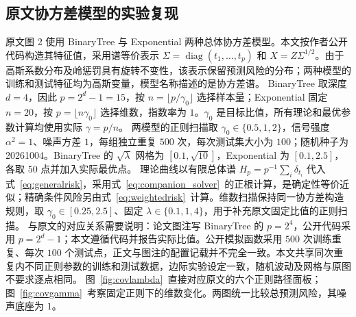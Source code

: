 \documentclass[UTF8,fontset=fandol,a4paper,zihao=-4]{ctexart}
\begin{document}
\subsection{原文协方差模型的实验复现}\label{sec:covariance_experiments}
原文图 2 使用 BinaryTree 与 Exponential 两种总体协方差模型\cite{dw,authorcode}。本文按作者公开代码构造其特征值，采用谱等价表示 $\Sigma=\operatorname{diag}(t_1,\ldots,t_p)$ 和 $X=Z\Sigma^{1/2}$。由于高斯系数分布及岭惩罚具有旋转不变性，该表示保留预测风险的分布；两种模型的训练和测试特征均为高斯变量，模型名称描述的是协方差谱。
BinaryTree 取深度 $d=4$，因此 $p=2^d-1=15$，按 $n=\lfloor p/\gamma_0\rfloor$ 选择样本量；Exponential 固定 $n=20$，按 $p=\lfloor n\gamma_0\rfloor$ 选择维数，指数率为 $1$。$\gamma_0$ 是目标比值，所有理论和最优参数计算均使用实际 $\gamma=p/n$。
两模型的正则扫描取 $\gamma_0\in\{0.5,1,2\}$，信号强度 $\alpha^2=1$、噪声方差 $1$，每组独立重复 $500$ 次，每次测试集大小为 $100$；随机种子为 20261004。BinaryTree 的 $\sqrt{\lambda}$ 网格为 $[0.1,\sqrt{10}]$，Exponential 为 $[0.1,2.5]$，各取 $50$ 点并加入实际最优点。
理论曲线以有限总体谱 $H_p=p^{-1}\sum_i\delta_{t_i}$ 代入式~\eqref{eq:generalrisk}，采用式~\eqref{eq:companion_solver}~的正根计算，是确定性等价近似；精确条件风险另由式~\eqref{eq:weightedrisk}~计算。维数扫描保持同一协方差构造规则，取 $\gamma_0\in[0.25,2.5]$、固定 $\lambda\in\{0.1,1,4\}$，用于补充原文固定比值的正则扫描。
与原文的对应关系需要说明：论文图注写 BinaryTree 的 $p=2^4$，公开代码采用 $p=2^d-1$；本文遵循代码并报告实际比值。公开模拟函数采用 $500$ 次训练重复、每次 $100$ 个测试点，正文与图注的配置记载并不完全一致。本文共享同次重复内不同正则参数的训练和测试数据，边际实验设定一致，随机波动及网格与原图不要求逐点相同。
图~\ref{fig:covlambda}~直接对应原文的六个正则路径面板；图~\ref{fig:covgamma}~考察固定正则下的维数变化。两图统一比较总预测风险，其噪声底座为 $1$。
\end{document}
